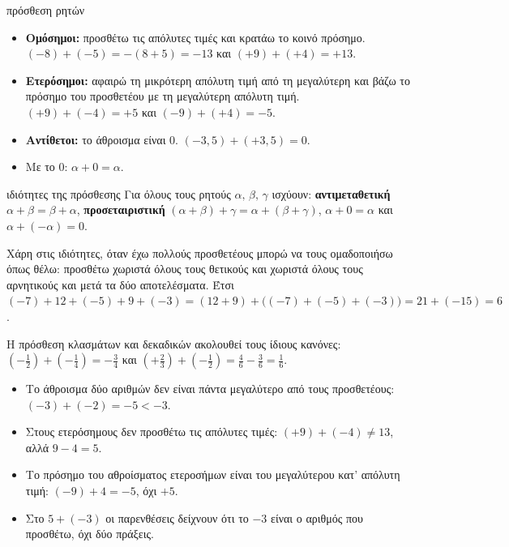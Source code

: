 \begin{kanonas}{πρόσθεση ρητών}
\begin{itemize}[leftmargin=1.2em,itemsep=0.3ex,topsep=2pt]
\item \textbf{Ομόσημοι:} προσθέτω τις απόλυτες τιμές και κρατάω το κοινό πρόσημο. $(-8)+(-5)=-(8+5)=-13$ και $(+9)+(+4)=+13$.
\item \textbf{Ετερόσημοι:} αφαιρώ τη μικρότερη απόλυτη τιμή από τη μεγαλύτερη και βάζω το πρόσημο του προσθετέου με τη μεγαλύτερη απόλυτη τιμή. $(+9)+(-4)=+5$ και $(-9)+(+4)=-5$.
\item \textbf{Αντίθετοι:} το άθροισμα είναι $0$. $(-3{,}5)+(+3{,}5)=0$.
\item Με το $0$: $\alpha+0=\alpha$.
\end{itemize}
\end{kanonas}

\begin{idiotita}{ιδιότητες της πρόσθεσης}
Για όλους τους ρητούς $\alpha,\,\beta,\,\gamma$ ισχύουν: \textbf{αντιμεταθετική} $\alpha+\beta=\beta+\alpha$, \textbf{προσεταιριστική} $(\alpha+\beta)+\gamma=\alpha+(\beta+\gamma)$, $\alpha+0=\alpha$ και $\alpha+(-\alpha)=0$.
\end{idiotita}

Χάρη στις ιδιότητες, όταν έχω πολλούς προσθετέους μπορώ να τους ομαδοποιήσω όπως θέλω: προσθέτω χωριστά όλους τους θετικούς και χωριστά όλους τους αρνητικούς και μετά τα δύο αποτελέσματα. Έτσι $(-7)+12+(-5)+9+(-3)=(12+9)+\big((-7)+(-5)+(-3)\big)=21+(-15)=6$.

Η πρόσθεση κλασμάτων και δεκαδικών ακολουθεί τους ίδιους κανόνες: $\left(-\frac{1}{2}\right)+\left(-\frac{1}{4}\right)=-\frac{3}{4}$ και $\left(+\frac{2}{3}\right)+\left(-\frac{1}{2}\right)=\frac{4}{6}-\frac{3}{6}=\frac{1}{6}$.

\begin{prosoxi}
\begin{itemize}[leftmargin=1.2em,itemsep=0.3ex,topsep=2pt]
\item Το άθροισμα δύο αριθμών δεν είναι πάντα μεγαλύτερο από τους προσθετέους: $(-3)+(-2)=-5<-3$.
\item Στους ετερόσημους δεν προσθέτω τις απόλυτες τιμές: $(+9)+(-4)\neq13$, αλλά $9-4=5$.
\item Το πρόσημο του αθροίσματος ετεροσήμων είναι του μεγαλύτερου κατ' απόλυτη τιμή: $(-9)+4=-5$, όχι $+5$.
\item Στο $5+(-3)$ οι παρενθέσεις δείχνουν ότι το $-3$ είναι ο αριθμός που προσθέτω, όχι δύο πράξεις.
\end{itemize}
\end{prosoxi}

